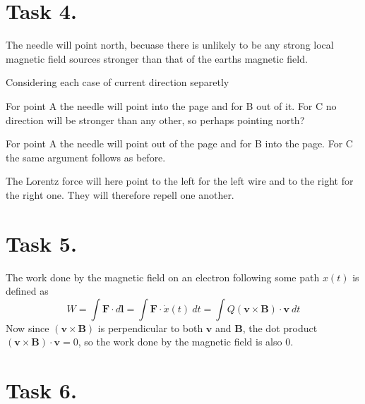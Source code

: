 \documentclass[a4paper,11pt]{article}
\begin{document}
\section*{Task 4.}
\begin{alphalist}
    \item The needle will point north, becuase there is unlikely to be any strong local magnetic field sources stronger than that of the earths
        magnetic field.
    \item Considering each case of current direction separetly
        \begin{romanlist}
            \item For point A the needle will point into the page and for B out of it. For C no direction will be stronger than any other, so
                perhaps pointing north?
            \item For point A the needle will point out of the page and for B into the page. For C the same argument follows as before.
        \end{romanlist}
    \item The Lorentz force will here point to the left for the left wire and to the right for the right one. They will therefore repell one another.
\end{alphalist}

\section*{Task 5.}
The work done by the magnetic field on an electron following some path $x(t)$ is defined as
\[
    W = \int \mathbf{F} \cdot d\mathbf{l} = \int \mathbf{F} \cdot \dot{x}(t) \:dt = \int Q(\mathbf{v} \times \mathbf{B}) \cdot \mathbf{v} \:dt
\]
Now since $(\mathbf{v} \times \mathbf{B})$ is perpendicular to both $\mathbf{v}$ and $\mathbf{B}$, the dot product
$(\mathbf{v} \times \mathbf{B}) \cdot \mathbf{v} = 0$, so the work done by the magnetic field is also 0.

\section*{Task 6.}
\begin{alphalist}
    \item 
    \item 
\end{alphalist}
\end{document}

